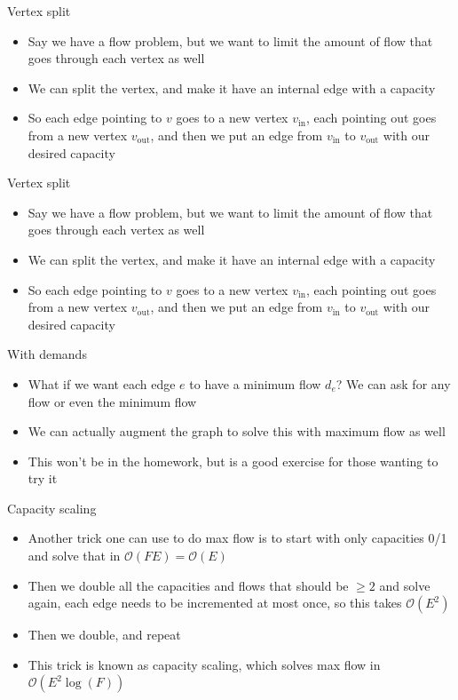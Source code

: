 \documentclass{beamer}
\begin{document}
	\begin{frame}[plain]{Vertex split}
		\begin{itemize}
			\item Say we have a flow problem, but we want to limit the amount of flow that goes through each vertex as well
			\item We can split the vertex, and make it have an internal edge with a capacity
			\item So each edge pointing to $v$ goes to a new vertex $v_{\text{in}}$, each pointing out goes from a new vertex $v_{\text{out}}$, and then we put an edge from $v_{\text{in}}$ to $v_{\text{out}}$ with our desired capacity
		\end{itemize}
	\end{frame}
	
	\begin{frame}[plain]{Vertex split}
		\begin{itemize}
			\item Say we have a flow problem, but we want to limit the amount of flow that goes through each vertex as well
			\item We can split the vertex, and make it have an internal edge with a capacity
			\item So each edge pointing to $v$ goes to a new vertex $v_{\text{in}}$, each pointing out goes from a new vertex $v_{\text{out}}$, and then we put an edge from $v_{\text{in}}$ to $v_{\text{out}}$ with our desired capacity
		\end{itemize}
	\end{frame}
	
	\begin{frame}[plain]{With demands}
		\begin{itemize}
			\item What if we want each edge $e$ to have a minimum flow $d_e$? We can ask for any flow or even the minimum flow
			\item We can actually augment the graph to solve this with maximum flow as well
			\item This won't be in the homework, but is a good exercise for those wanting to try it
		\end{itemize}
	\end{frame}
	
	\begin{frame}[plain]{Capacity scaling}
		\begin{itemize}
			\item Another trick one can use to do max flow is to start with only capacities 0/1 and solve that in $\mathcal{O}(FE) = \mathcal{O}(E)$
			\item Then we double all the capacities and flows that should be $\geq 2$ and solve again, each edge needs to be incremented at most once,
			 so this takes $\mathcal{O}(E^2)$
			 \item Then we double, and repeat
			 \item This trick is known as capacity scaling, which solves max flow in $\mathcal{O}(E^2 \log(F))$
		\end{itemize}
	\end{frame}
	
\end{document}

